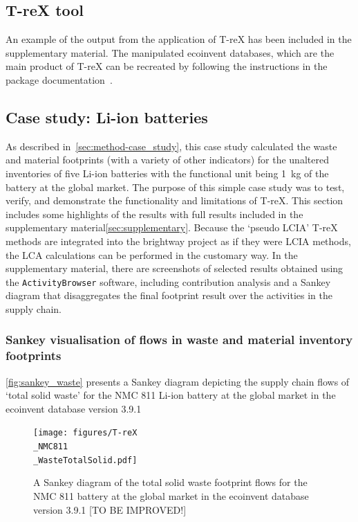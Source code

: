 \subsection{T-reX tool}\label{sec:results-T-reX}

An example of the output from the application of T-reX has been included in the supplementary material. The manipulated ecoinvent databases, which are the main product of T-reX can be recreated by following the instructions in the package documentation~\citep{mcdowall2023T-reXdocs}.

\subsection{Case study: Li-ion batteries}\label{sec:results-case_study}

As described in~\autoref{sec:method-case_study}, this case study calculated the waste and material footprints (with a variety of other indicators) for the unaltered inventories of five Li-ion batteries with the functional unit being 1~kg of the battery at the global market. The purpose of this simple case study was to test, verify, and demonstrate the functionality and limitations of T-reX. This section includes some highlights of the results with full results included in the supplementary material\autoref{sec:supplementary}. Because the `pseudo LCIA' T-reX methods are integrated into the brightway project as if they were LCIA methods, the LCA calculations can be performed in the customary way. In the supplementary material, there are screenshots of selected results obtained using the \texttt{ActivityBrowser} software, including contribution analysis and a Sankey diagram that disaggregates the final footprint result over the activities in the supply chain.

\subsubsection{Sankey visualisation of flows in waste and material inventory footprints}\label{sec:results-case_study-sankey}

\autoref{fig:sankey_waste} presents a Sankey diagram depicting the supply chain flows of `total solid waste' for the NMC 811 Li-ion battery at the global market in the ecoinvent database version 3.9.1

\begin{figure}[H]
    \centering
    \texttt{[image: figures/T-reX\\\_NMC811\\\_WasteTotalSolid.pdf]}
    \caption{A Sankey diagram of the total solid waste footprint flows for the NMC 811 battery at the global market in the ecoinvent database version 3.9.1 [TO BE IMPROVED!]}\label{fig:sankey_waste}
\end{figure}

